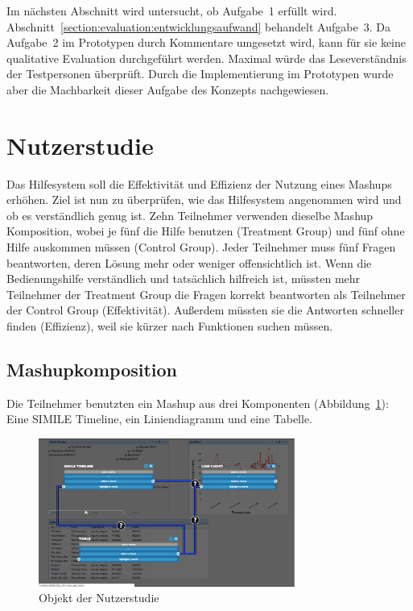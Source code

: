 \documentclass[
	headsepline,
	footsepline,
	fontsize=12pt,
	bibliography=totoc
]{scrbook}
\begin{document}
Im nächsten Abschnitt wird untersucht, ob Aufgabe~1 erfüllt wird. Abschnitt~\ref{section:evaluation:entwicklungsaufwand} behandelt Aufgabe~3. Da Aufgabe~2 im Prototypen durch Kommentare umgesetzt wird, kann für sie keine qualitative Evaluation durchgeführt werden. Maximal würde das Leseverständnis der Testpersonen überprüft. Durch die Implementierung im Prototypen wurde aber die Machbarkeit dieser Aufgabe des Konzepts nachgewiesen.

\section{Nutzerstudie}
\label{section:evaluation:nutzerstudie}

Das Hilfesystem soll die Effektivität und Effizienz der Nutzung eines Mashups erhöhen. Ziel ist nun zu überprüfen, wie das Hilfesystem angenommen wird und ob es verständlich genug ist. Zehn Teilnehmer verwenden dieselbe Mashup Komposition, wobei je fünf die Hilfe benutzen (Treatment Group) und fünf ohne Hilfe auskommen müssen (Control Group). Jeder Teilnehmer muss fünf Fragen beantworten, deren Lösung mehr oder weniger offensichtlich ist. Wenn die Bedienungshilfe verständlich und tatsächlich hilfreich ist, müssten mehr Teilnehmer der Treatment Group die Fragen korrekt beantworten als Teilnehmer der Control Group (Effektivität). Außerdem müssten sie die Antworten schneller finden (Effizienz), weil sie kürzer nach Funktionen suchen müssen.

\subsection{Mashupkomposition}

Die Teilnehmer benutzten ein Mashup aus drei Komponenten (Abbildung~\ref{figure:objekt}): Eine SIMILE Timeline, ein Liniendiagramm und eine Tabelle. 

\begin{figure}[htbp]
   \centering
   \includegraphics[width=0.75\textwidth]{images/evaluation-objekt.png}
   \caption{Objekt der Nutzerstudie}
   \label{figure:objekt}
\end{figure}
\end{document}
